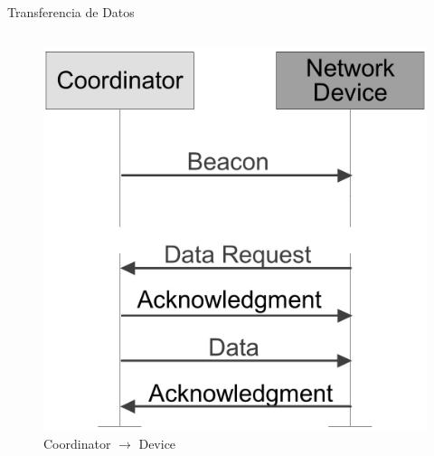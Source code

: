 \documentclass[aspectratio=169]{beamer}
\begin{document}
\begin{frame}[t]{Transferencia de Datos}
\begin{columns}[t]
\begin{column}{.5\textwidth}
\begin{minipage}[t][0.7\textheight][s]{\columnwidth}
\begin{figure}[H]
				\includegraphics[height=.7\textheight]{./imagenes/coord-dev-beacon.jpg}
				\vfill
				\caption{Coordinator $\rightarrow$ Device}
			\end{figure}	 		
		\end{minipage}
	\end{column}
\end{columns}
\end{frame}
\end{document}
